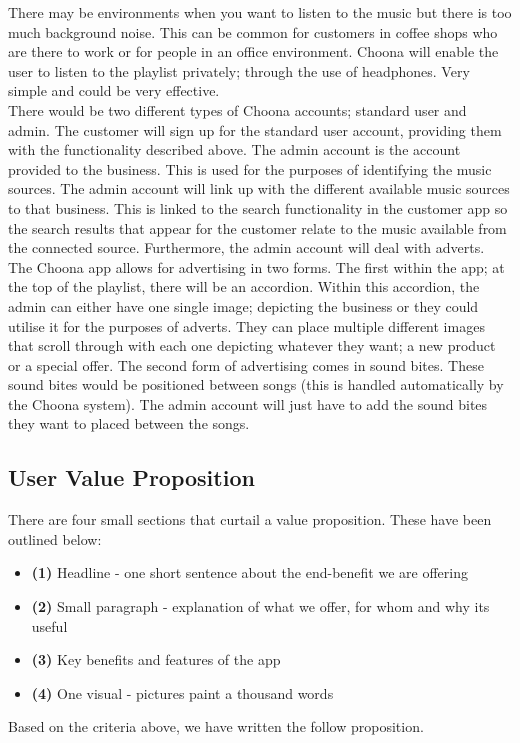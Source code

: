 There may be environments when you want to listen to the music but there is too much background noise.  This can be common for customers in coffee shops who are there to work or for people in an office environment.  Choona will enable the user to listen to the playlist privately; through the use of headphones.  Very simple and could be very effective.  \\

There would be two different types of Choona accounts; standard user and admin.  The customer will sign up for the standard user account, providing them with the functionality described above.  The admin account is the account provided to the business.  This is used for the purposes of identifying the music sources.  The admin account will link up with the different available music sources to that business.  This is linked to the search functionality in the customer app so the search results that appear for the customer relate to the music available from the connected source.  Furthermore, the admin account will deal with adverts.  The Choona app allows for advertising in two forms.  The first within the app; at the top of the playlist, there will be an accordion.  Within this accordion, the admin can either have one single image; depicting the business or they could utilise it for the purposes of adverts.  They can place multiple different images that scroll through with each one depicting whatever they want; a new product or a special offer.  The second form of advertising comes in sound bites.  These sound bites would be positioned between songs (this is handled automatically by the Choona system).  The admin account will just have to add the sound bites they want to placed between the songs.  

\subsection{User Value Proposition}
There are four small sections that curtail a value proposition.  These have been outlined below:
\begin{itemize}
\item \textbf{(1)} Headline - one short sentence about the end-benefit we are offering
\item \textbf{(2)} Small paragraph - explanation of what we offer, for whom and why its useful
\item \textbf{(3)} Key benefits and features of the app
\item \textbf{(4)} One visual - pictures paint a thousand words
\end{itemize}
Based on the criteria above, we have written the follow proposition.\\

